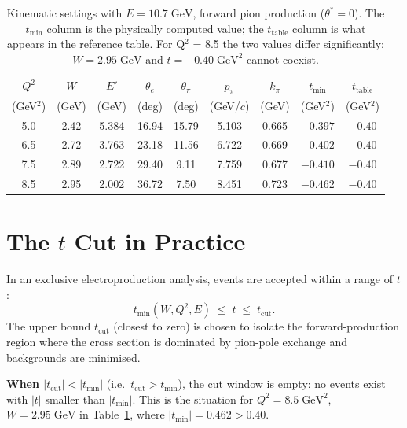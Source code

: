 \documentclass[12pt,a4paper]{article}
\begin{document}
\begin{table}[h!]
\centering
\caption{Kinematic settings with $E = 10.7\;\text{GeV}$, forward pion
production ($\theta^* = 0$). The $t_\text{min}$ column is the physically
computed value; the $t_\text{table}$ column is what appears in the reference
table. For Q$^2$ = 8.5 the two values differ significantly: $W = 2.95\;\text{GeV}$
and $t = -0.40\;\text{GeV}^2$ cannot coexist.}
\label{tab:tmin}
\begin{tabular}{ccccccccc}
\toprule
$Q^2$ & $W$ & $E'$ & $\theta_e$ & $\theta_\pi$ & $p_\pi$ & $k_\pi$
& $t_\text{min}$ & $t_\text{table}$ \\
(GeV$^2$) & (GeV) & (GeV) & (deg) & (deg) & (GeV/$c$) & (GeV)
& (GeV$^2$) & (GeV$^2$) \\
\midrule
5.0 & 2.42 & 5.384 & 16.94 & 15.79 & 5.103 & 0.665 & $-0.397$ & $-0.40$ \\
6.5 & 2.72 & 3.763 & 23.18 & 11.56 & 6.722 & 0.669 & $-0.402$ & $-0.40$ \\
7.5 & 2.89 & 2.722 & 29.40 &  9.11 & 7.759 & 0.677 & $-0.410$ & $-0.40$ \\
8.5 & 2.95 & 2.002 & 36.72 &  7.50 & 8.451 & 0.723 & $-0.462$ & $-0.40$ \\
\bottomrule
\end{tabular}
\end{table}

\section{The \texorpdfstring{$t$}{t} Cut in Practice}

In an exclusive electroproduction analysis, events are accepted within a
range of $t$:
\begin{equation}
  t_\text{min}(W,Q^2,E) \;\leq\; t \;\leq\; t_\text{cut}.
  \label{eq:trange}
\end{equation}
The upper bound $t_\text{cut}$ (closest to zero) is chosen to isolate the
forward-production region where the cross section is dominated by pion-pole
exchange and backgrounds are minimised.

\textbf{When $|t_\text{cut}| < |t_\text{min}|$} (i.e.\ $t_\text{cut} >
t_\text{min}$), the cut window is empty: no events exist with $|t|$ smaller
than $|t_\text{min}|$. This is the situation for $Q^2 = 8.5\;\text{GeV}^2$,
$W = 2.95\;\text{GeV}$ in Table~\ref{tab:tmin}, where $|t_\text{min}| =
0.462 > 0.40$.
\end{document}
